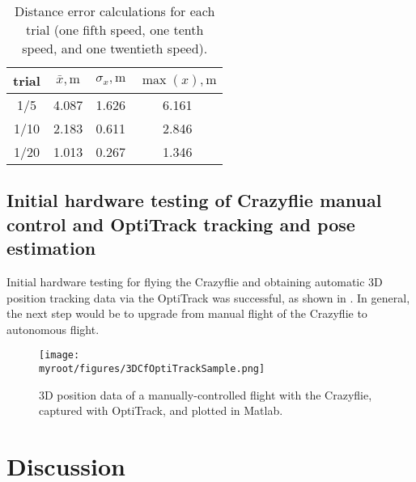 \documentclass[onecolumn,10pt]{IEEEtran}
\newcommand{\myroot}{../}
\newcommand{\MATLAB}{Matlab}
\begin{document}
\begin{table}[hb]
\caption{Distance error calculations for each trial (one fifth speed, one tenth speed, and one twentieth speed).}
\label{tab:RMSE}
\begin{center}
\begin{tabular}{cccc}
\toprule
trial & $\bar{x}, \si{\meter}$ & $\sigma_x, \si{\meter}$ & $\max(x), \si{\meter}$  \\ %
\midrule
1/5 & 4.087 & 1.626 & 6.161 \\
1/10 & 2.183 & 0.611 & 2.846 \\
1/20 & 1.013 & 0.267 & 1.346 \\
\bottomrule
\end{tabular}
\end{center}
\end{table}

\subsection{Initial hardware testing of Crazyflie manual control and OptiTrack tracking and pose estimation}
Initial hardware testing for flying the Crazyflie and obtaining automatic 3D position tracking data via the OptiTrack was successful, as shown in . In general, the next step would be to upgrade from manual flight of the Crazyflie to autonomous flight.
\begin{figure}
\begin{center}
\texttt{[image: \\myroot/figures/3DCfOptiTrackSample.png]}
\end{center}
\caption{3D  position data  of a manually-controlled flight with the Crazyflie, captured with OptiTrack, and plotted in \MATLAB.}
\label{fig:manualFlight}
\end{figure}
	







\clearpage
\section{Discussion}
\end{document}
